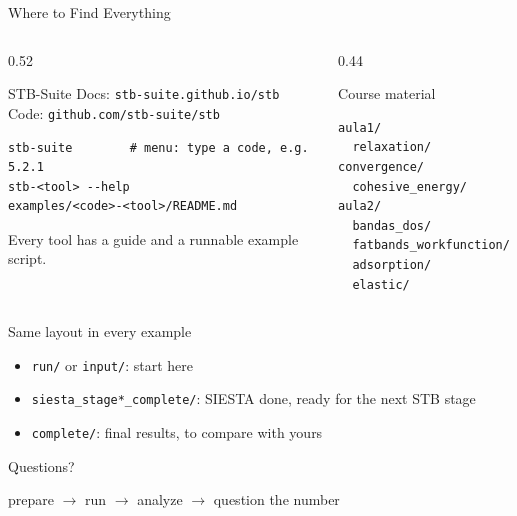 \documentclass[8pt]{beamer}
\begin{document}
\begin{frame}[fragile]{Where to Find Everything}
	\begin{columns}[T]
		\begin{column}{0.52\textwidth}
			\begin{block}{STB-Suite}
				\small
				Docs: \texttt{stb-suite.github.io/stb}\\
				Code: \texttt{github.com/stb-suite/stb}\\[3pt]
				{\scriptsize
\begin{verbatim}
stb-suite        # menu: type a code, e.g. 5.2.1
stb-<tool> --help
examples/<code>-<tool>/README.md
\end{verbatim}
				}
				{\scriptsize Every tool has a guide and a runnable example script.}
			\end{block}
		\end{column}
		\begin{column}{0.44\textwidth}
			\begin{block}{Course material}
				{\footnotesize
\begin{verbatim}
aula1/
  relaxation/  convergence/
  cohesive_energy/
aula2/
  bandas_dos/
  fatbands_workfunction/
  adsorption/
  elastic/
\end{verbatim}
				}
			\end{block}
		\end{column}
	\end{columns}
	\vspace{0.1cm}
	\begin{alertblock}{Same layout in every example}
		\small
		\begin{itemize}
			\item \texttt{run/} or \texttt{input/}: start here
			\item \texttt{siesta\_stage*\_complete/}: SIESTA done, ready for the next STB stage
			\item \texttt{complete/}: final results, to compare with yours
		\end{itemize}
	\end{alertblock}
\end{frame}

\begin{frame}[standout]
	Questions?
	\par\vspace{0.6cm}
	{\normalsize\mdseries prepare $\rightarrow$ run $\rightarrow$ analyze $\rightarrow$ question the number}
\end{frame}
\end{document}
